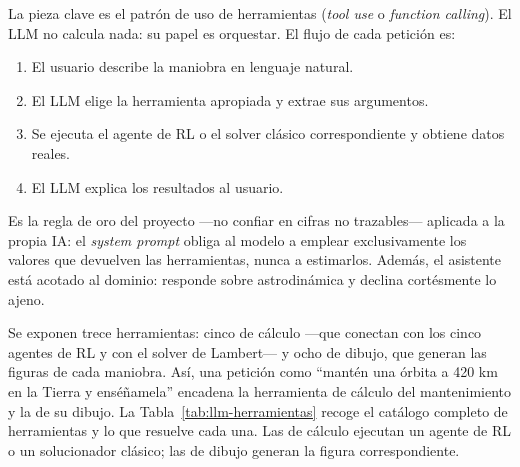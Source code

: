 La pieza clave es el patrón de uso de herramientas (\textit{tool use} o
\textit{function calling}). El \gls{LLM}  no calcula nada: su papel es orquestar. El flujo de cada petición es:

\begin{enumerate}
  \item El usuario describe la maniobra en lenguaje natural.
  \item El \gls{LLM}  elige la herramienta apropiada y extrae sus argumentos.
  \item Se ejecuta el agente de \gls{RL} o el solver clásico correspondiente y obtiene datos reales.
  \item El \gls{LLM}  explica los resultados al usuario.
\end{enumerate}

Es la regla de oro del proyecto ---no confiar en cifras no trazables--- aplicada a la propia \gls{IA}: el \textit{system prompt} obliga al modelo a emplear exclusivamente los valores que devuelven las herramientas, nunca a estimarlos. Además, el asistente está acotado al dominio: responde sobre astrodinámica y declina cortésmente lo ajeno.

Se exponen trece herramientas: cinco de cálculo ---que conectan con los cinco agentes de RL y con el solver de Lambert--- y ocho de dibujo, que generan las figuras de cada maniobra. Así, una petición como ``mantén una órbita a 420 km en la
Tierra y enséñamela'' encadena la herramienta de cálculo del mantenimiento y la de su dibujo. La Tabla~\ref{tab:llm-herramientas} recoge el catálogo completo de herramientas y lo que resuelve cada una.  Las de cálculo ejecutan un agente de \gls{RL} o un solucionador clásico; las de dibujo generan la figura correspondiente.

